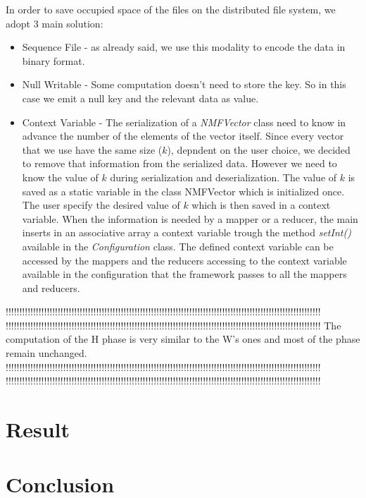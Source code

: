 \documentclass[a4paper,12pt]{article}
\newcommand{\METHOD}[1] {\textit{#1}}
\newcommand{\CLASS}[1] {\textit{#1}}
\begin{document}
In order to save occupied space of the files on the distributed file system, we adopt 3 main solution:
\begin{itemize}

  \item Sequence File - as already said, we use this modality to encode the data in binary format. 
  
  \item Null Writable - Some computation doesn't need to store the key. So in this case we emit a null key and the relevant data as value.
  
  \item Context Variable - The serialization of a \CLASS{NMFVector} class need to know in advance the number of the elements of the vector itself. Since every vector that we use have the same size ($k$), depndent on the user choice, we decided to remove that information from the serialized data. However we need to know the value of $k$ during serialization and deserialization. The value of $k$ is saved as a static variable in the class NMFVector which is initialized once. The user specify the desired value of $k$ which is then saved in a context variable. When the information is needed by a mapper or a reducer, the main inserts in an associative array a context variable trough the method \METHOD{setInt()} available in the \CLASS{Configuration} class. The defined context variable can be accessed by the mappers and the reducers accessing to the context variable available in the configuration that the framework passes to all the mappers and reducers.

\end{itemize}








!!!!!!!!!!!!!!!!!!!!!!!!!!!!!!!!!!!!!!!!!!!!!!!!!!!!!!!!!!!!!!!!!!!!!!!!!!!!!!!!!!!!!!!!!!!!!!!!!!!!!!!!!!!!!!!!!!!
!!!!!!!!!!!!!!!!!!!!!!!!!!!!!!!!!!!!!!!!!!!!!!!!!!!!!!!!!!!!!!!!!!!!!!!!!!!!!!!!!!!!!!!!!!!!!!!!!!!!!!!!!!!!!!!!!!!
The computation of the H phase is very similar to the W's ones and
most of the phase remain unchanged.
!!!!!!!!!!!!!!!!!!!!!!!!!!!!!!!!!!!!!!!!!!!!!!!!!!!!!!!!!!!!!!!!!!!!!!!!!!!!!!!!!!!!!!!!!!!!!!!!!!!!!!!!!!!!!!!!!!!
!!!!!!!!!!!!!!!!!!!!!!!!!!!!!!!!!!!!!!!!!!!!!!!!!!!!!!!!!!!!!!!!!!!!!!!!!!!!!!!!!!!!!!!!!!!!!!!!!!!!!!!!!!!!!!!!!!!

\section{Result}
\label{result}

\section{Conclusion}
\label{conclusion}


\nocite{*}




\end{document}

